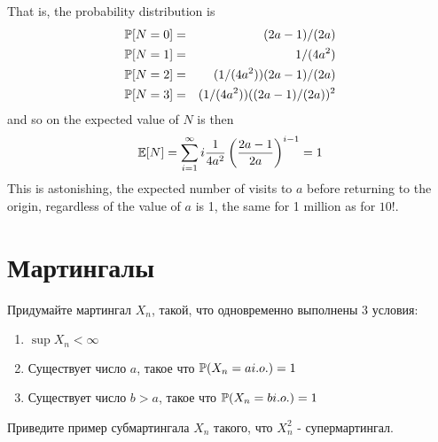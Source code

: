 \begin{problem}
\begin{sol}
That is, the probability distribution is
\begin{eqnarray*}
  \P[N = 0] &=& (2a-1)/(2a) \\
  \P[N = 1] &=& 1/(4a^2) \\
  \P[N = 2] &=& ( 1/(4 a^2)) (2a-1)/(2a) \\
  \P[N = 3] &=& ( 1/(4 a^2)) ((2a-1)/(2a))^2 \\
\end{eqnarray*}
and so on the expected value of $N$ is then
\[
    \E[N] = \sum_{i=1}^{\infty} i \frac{1}{4a^2} \left(
    \frac{2a-1}{2a} \right)^{i-1} = 1
\]
This is astonishing, the expected number of visits to $a$
before returning to the origin, regardless of the value of $a$
is 1, the same for 1 million as for $10$!.
\end{sol}
\end{problem}



\section{Мартингалы}

\begin{problem}
Придумайте мартингал $X_{n}$, такой, что одновременно выполнены 3 условия: \\
\begin{enumerate}
\item $\sup X_n<\infty$ \\
\item Существует число $a$, такое что $\P(X_{n}=a i.o.)=1$
\item Существует число $b>a$, такое что $\P(X_{n}=b i.o.)=1$
\end{enumerate}

\begin{sol}

\end{sol}
\end{problem}

\begin{problem}
Приведите пример субмартингала $X_{n}$ такого, что $X_{n}^{2}$ -
супермартингал.

\begin{sol}

\end{sol}
\end{problem}

